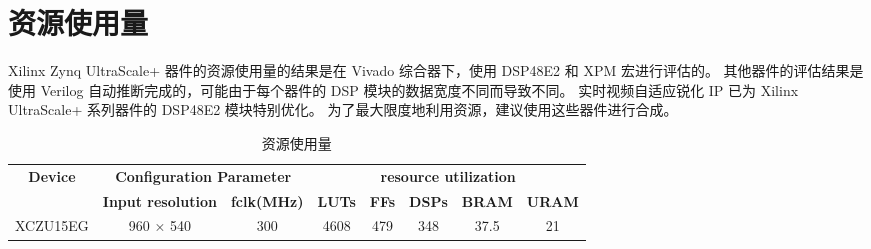 \documentclass[12pt, a4paper, oneside]{ctexbook}
\begin{document}
	\section{资源使用量}	
	Xilinx Zynq UltraScale+ 器件的资源使用量的结果是在 Vivado 综合器下，使用 DSP48E2 和 XPM 宏进行评估的。
	其他器件的评估结果是使用 Verilog 自动推断完成的，可能由于每个器件的 DSP 模块的数据宽度不同而导致不同。
	实时视频自适应锐化 IP 已为 Xilinx UltraScale+ 系列器件的 DSP48E2 模块特别优化。
	为了最大限度地利用资源，建议使用这些器件进行合成。
	\begin{table}[h]
		\centering
		\begin{tabular}{|c|cc|ccccc|}
			\hline
			\multirow{2}{*}{\textbf{Device}} & \multicolumn{2}{c|}{\textbf{Configuration Parameter}}               & \multicolumn{5}{c|}{\textbf{resource utilization}}                                                                                                               \\ \cline{2-8} 
			& \multicolumn{1}{c|}{\textbf{Input resolution}} & \textbf{fclk(MHz)} & \multicolumn{1}{c|}{\textbf{LUTs}} & \multicolumn{1}{c|}{\textbf{FFs}} & \multicolumn{1}{c|}{\textbf{DSPs}} & \multicolumn{1}{c|}{\textbf{BRAM}} & \textbf{URAM} \\ \hline
			XCZU15EG                         & \multicolumn{1}{c|}{960 × 540}                 & 300                & \multicolumn{1}{c|}{4608}           & \multicolumn{1}{c|}{479}         & \multicolumn{1}{c|}{348}           & \multicolumn{1}{c|}{37.5}             & 21            \\ \hline
		\end{tabular}
	\caption{资源使用量}
	\end{table}
	
\end{document}
